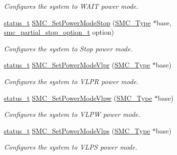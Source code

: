 \begin{DoxyCompactItemize}
\begin{DoxyCompactList}\small\item\em Configures the system to W\+A\+IT power mode. \end{DoxyCompactList}\item 
\mbox{\hyperlink{group__ksdk__common_gaaabdaf7ee58ca7269bd4bf24efcde092}{status\+\_\+t}} \mbox{\hyperlink{group__smc_gaa1e2666198ce75322be3280472a224ee}{S\+M\+C\+\_\+\+Set\+Power\+Mode\+Stop}} (\mbox{\hyperlink{struct_s_m_c___type}{S\+M\+C\+\_\+\+Type}} $\ast$base, \mbox{\hyperlink{group__smc_gaf4ac8e3c162dfdfca1ab17fc2d78bf82}{smc\+\_\+partial\+\_\+stop\+\_\+option\+\_\+t}} option)
\begin{DoxyCompactList}\small\item\em Configures the system to Stop power mode. \end{DoxyCompactList}\item 
\mbox{\hyperlink{group__ksdk__common_gaaabdaf7ee58ca7269bd4bf24efcde092}{status\+\_\+t}} \mbox{\hyperlink{group__smc_gaa1439e98fb0d82099217f822e3329b14}{S\+M\+C\+\_\+\+Set\+Power\+Mode\+Vlpr}} (\mbox{\hyperlink{struct_s_m_c___type}{S\+M\+C\+\_\+\+Type}} $\ast$base)
\begin{DoxyCompactList}\small\item\em Configures the system to V\+L\+PR power mode. \end{DoxyCompactList}\item 
\mbox{\hyperlink{group__ksdk__common_gaaabdaf7ee58ca7269bd4bf24efcde092}{status\+\_\+t}} \mbox{\hyperlink{group__smc_ga69d0fb061423ef6ed718f3acee96ebf6}{S\+M\+C\+\_\+\+Set\+Power\+Mode\+Vlpw}} (\mbox{\hyperlink{struct_s_m_c___type}{S\+M\+C\+\_\+\+Type}} $\ast$base)
\begin{DoxyCompactList}\small\item\em Configures the system to V\+L\+PW power mode. \end{DoxyCompactList}\item 
\mbox{\hyperlink{group__ksdk__common_gaaabdaf7ee58ca7269bd4bf24efcde092}{status\+\_\+t}} \mbox{\hyperlink{group__smc_ga7f7303f155f36716cc68672e0a4027cf}{S\+M\+C\+\_\+\+Set\+Power\+Mode\+Vlps}} (\mbox{\hyperlink{struct_s_m_c___type}{S\+M\+C\+\_\+\+Type}} $\ast$base)
\begin{DoxyCompactList}\small\item\em Configures the system to V\+L\+PS power mode. \end{DoxyCompactList}\end{DoxyCompactItemize}


